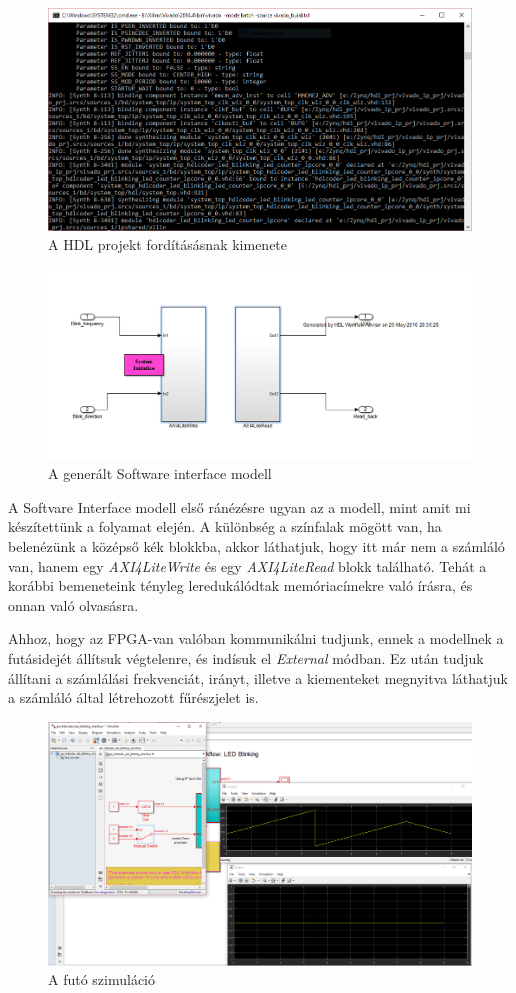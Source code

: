 \begin{figure}[!ht]
	\centering
	\includegraphics[width = \textwidth]{figures/bitstream.PNG}
	\caption{A HDL projekt fordításásnak kimenete} 
	\label{fig:bitstream}
\end{figure}

\begin{figure}[!ht]
	\centering
	\includegraphics[width = \textwidth]{figures/interface.PNG}
	\caption{A generált Software interface modell} 
	\label{fig:swinterface}
\end{figure}

A Softvare Interface modell első ránézésre ugyan az a modell, mint amit mi készítettünk a folyamat elején. A különbség a színfalak mögött van, ha belenézünk a középső kék blokkba, akkor láthatjuk, hogy itt már nem a számláló van, hanem egy \emph{AXI4LiteWrite} és egy \emph{AXI4LiteRead} blokk található. Tehát a korábbi bemeneteink tényleg leredukálódtak memóriacímekre való írásra, és onnan való olvasásra.

Ahhoz, hogy az FPGA-van valóban kommunikálni tudjunk, ennek a modellnek a futásidejét állítsuk végtelenre, és indísuk el \emph{External} módban. Ez után tudjuk állítani a számlálási frekvenciát, irányt, illetve a kiementeket megnyitva láthatjuk a számláló által létrehozott fűrészjelet is.

\begin{figure}[!ht]
	\centering
	\includegraphics[width = \textwidth]{figures/running.PNG}
	\caption{A futó szimuláció} 
	\label{fig:simualtion}
\end{figure}